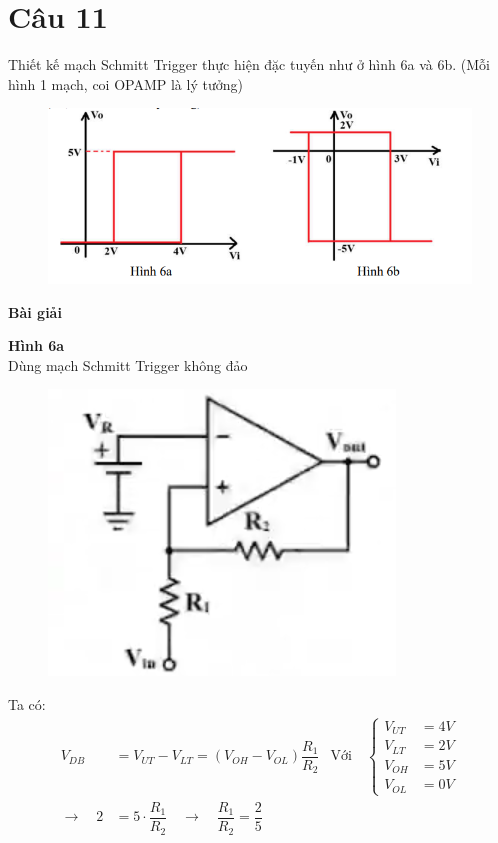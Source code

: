 \section{Câu 11}
Thiết kế mạch Schmitt Trigger thực hiện đặc tuyến như ở hình 6a và 6b. (Mỗi hình 1
mạch, coi OPAMP là lý tưởng)
\begin{figure}[H]
	\centering
	\includegraphics[scale=0.6]{image/C11_De.png}
\end{figure}

\begin{center}
\textbf{Bài giải}
\end{center}

\textbf{Hình 6a}\\
Dùng mạch Schmitt Trigger không đảo
\begin{figure}[H]
	\centering
	\includegraphics[scale=0.55]{image/C11_Trigger_Ko_Dao.png}
\end{figure}
Ta có:
\begin{align*}
	V_{DB} &= V_{UT} - V_{LT} = (V_{OH}-V_{OL})\dfrac{R_1}{R_2}
	&\hspace{0cm}\text{Với}\quad
	\left\{
	\begin{aligned}
		V_{UT} &= 4V\\
		V_{LT} &= 2V\\
		V_{OH} &= 5V\\
		V_{OL} &= 0V
	\end{aligned}
	\right.\\
	\rightarrow\quad   2 &= 5 \cdot \dfrac{R_1}{R_2} \quad
    \rightarrow\quad \dfrac{R_1}{R_2} = \dfrac{2}{5} 
\end{align*}

